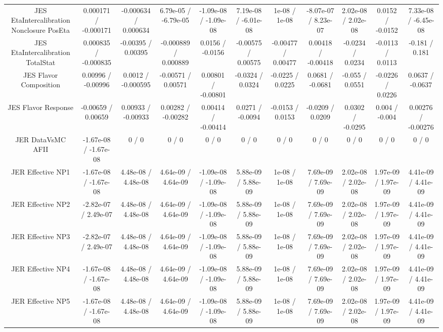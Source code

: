 \begin{table}[htbp]
\begin{center}
\begin{tabular}{|c|c|c|c|c|c|c|c|c|c|c|}
  JES EtaIntercalibration Nonclosure PosEta & 0.000171 / -0.000171 & -0.000634 / 0.000634 & 6.79e-05 / -6.79e-05 & -1.09e-08 / -1.09e-08 & 7.19e-08 / -6.01e-08 & 1e-08 / 1e-08 & -8.07e-07 / 8.23e-07 & 2.02e-08 / 2.02e-08 & 0.0152 / -0.0152 & 7.33e-08 / -6.45e-08 \\ 
  JES EtaIntercalibration TotalStat & 0.000835 / -0.000835 & -0.00395 / 0.00395 & -0.000889 / 0.000889 & 0.0156 / -0.0156 & -0.00575 / 0.00575 & -0.00477 / 0.00477 & 0.00418 / -0.00418 & -0.0234 / 0.0234 & -0.0113 / 0.0113 & -0.181 / 0.181 \\ 
  JES Flavor Composition & 0.00996 / -0.00996 & 0.0012 / -0.000595 & -0.00571 / 0.00571 & 0.00801 / -0.00801 & -0.0324 / 0.0324 & -0.0225 / 0.0225 & 0.0681 / -0.0681 & -0.055 / 0.0551 & -0.0226 / 0.0226 & 0.0637 / -0.0637 \\ 
  JES Flavor Response & -0.00659 / 0.00659 & 0.00933 / -0.00933 & 0.00282 / -0.00282 & 0.00414 / -0.00414 & 0.0271 / -0.0094 & -0.0153 / 0.0153 & -0.0209 / 0.0209 & 0.0302 / -0.0295 & 0.004 / -0.004 & 0.00276 / -0.00276 \\ 
  JER DataVsMC AFII & -1.67e-08 / -1.67e-08 & 0 / 0 & 0 / 0 & 0 / 0 & 0 / 0 & 0 / 0 & 0 / 0 & 0 / 0 & 0 / 0 & 0 / 0 \\ 
  JER Effective NP1 & -1.67e-08 / -1.67e-08 & 4.48e-08 / 4.48e-08 & 4.64e-09 / 4.64e-09 & -1.09e-08 / -1.09e-08 & 5.88e-09 / 5.88e-09 & 1e-08 / 1e-08 & 7.69e-09 / 7.69e-09 & 2.02e-08 / 2.02e-08 & 1.97e-09 / 1.97e-09 & 4.41e-09 / 4.41e-09 \\ 
  JER Effective NP2 & -2.82e-07 / 2.49e-07 & 4.48e-08 / 4.48e-08 & 4.64e-09 / 4.64e-09 & -1.09e-08 / -1.09e-08 & 5.88e-09 / 5.88e-09 & 1e-08 / 1e-08 & 7.69e-09 / 7.69e-09 & 2.02e-08 / 2.02e-08 & 1.97e-09 / 1.97e-09 & 4.41e-09 / 4.41e-09 \\ 
  JER Effective NP3 & -2.82e-07 / 2.49e-07 & 4.48e-08 / 4.48e-08 & 4.64e-09 / 4.64e-09 & -1.09e-08 / -1.09e-08 & 5.88e-09 / 5.88e-09 & 1e-08 / 1e-08 & 7.69e-09 / 7.69e-09 & 2.02e-08 / 2.02e-08 & 1.97e-09 / 1.97e-09 & 4.41e-09 / 4.41e-09 \\ 
  JER Effective NP4 & -1.67e-08 / -1.67e-08 & 4.48e-08 / 4.48e-08 & 4.64e-09 / 4.64e-09 & -1.09e-08 / -1.09e-08 & 5.88e-09 / 5.88e-09 & 1e-08 / 1e-08 & 7.69e-09 / 7.69e-09 & 2.02e-08 / 2.02e-08 & 1.97e-09 / 1.97e-09 & 4.41e-09 / 4.41e-09 \\ 
  JER Effective NP5 & -1.67e-08 / -1.67e-08 & 4.48e-08 / 4.48e-08 & 4.64e-09 / 4.64e-09 & -1.09e-08 / -1.09e-08 & 5.88e-09 / 5.88e-09 & 1e-08 / 1e-08 & 7.69e-09 / 7.69e-09 & 2.02e-08 / 2.02e-08 & 1.97e-09 / 1.97e-09 & 4.41e-09 / 4.41e-09 \\ 

\end{tabular}
\end{center}
\end{table}
